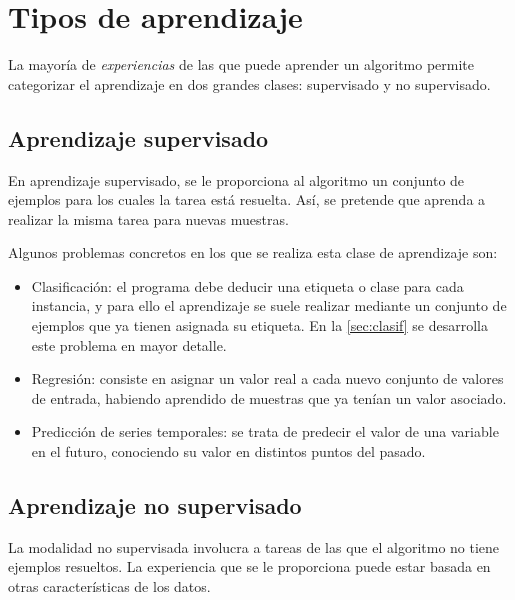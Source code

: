 \section{Tipos de aprendizaje}\label{sec:learning-types}

La mayoría de \emph{experiencias} de las que puede
aprender un algoritmo permite categorizar el aprendizaje en dos grandes clases:
supervisado y no supervisado.


\subsection{Aprendizaje supervisado}

En aprendizaje supervisado, se le proporciona al algoritmo un conjunto
de ejemplos para los cuales la tarea está resuelta. Así, se pretende que
aprenda a realizar la misma tarea para nuevas muestras.

Algunos problemas concretos en los que se realiza esta clase de aprendizaje son:
\begin{itemize}
\item Clasificación: el programa debe deducir una etiqueta o clase para cada instancia, y para ello el aprendizaje se suele realizar mediante un conjunto de ejemplos que ya tienen asignada su etiqueta. En la \autoref{sec:clasif} se desarrolla este problema en mayor detalle.
\item Regresión: consiste en asignar un valor real a cada nuevo conjunto de valores de entrada, habiendo aprendido de muestras que ya tenían un valor asociado.
\item Predicción de series temporales: se trata de predecir el valor de una variable en el futuro, conociendo su valor en distintos puntos del pasado.
\end{itemize}

\subsection{Aprendizaje no supervisado}\label{aprendizaje-no-supervisado}

La modalidad no supervisada involucra a tareas de las que el algoritmo
no tiene ejemplos resueltos. La experiencia que se le
proporciona puede estar basada en otras características de los datos.

